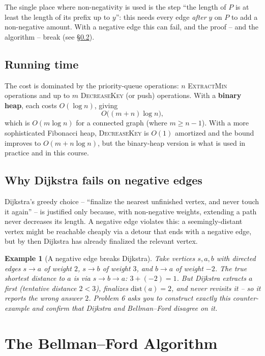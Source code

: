 \documentclass[11pt]{article}
\newtheorem{example}[theorem]{Example}
\begin{document}
The single place where non-negativity is used is the step ``the length of $P$ is
at least the length of its prefix up to $y$'': this needs every edge \emph{after}
$y$ on $P$ to add a non-negative amount. With a negative edge this can fail, and
the proof -- and the algorithm -- break (see \S\ref{sec:negative}).

\subsection{Running time}

The cost is dominated by the priority-queue operations: $n$ \textsc{ExtractMin}
operations and up to $m$ \textsc{DecreaseKey} (or push) operations. With a
\textbf{binary heap}, each costs $O(\log n)$, giving
\[
    O\big((m + n)\log n\big),
\]
which is $O(m \log n)$ for a connected graph (where $m \ge n - 1$). With a more
sophisticated Fibonacci heap, \textsc{DecreaseKey} is $O(1)$ amortized and the
bound improves to $O(m + n\log n)$, but the binary-heap version is what is used
in practice and in this course.

\subsection{Why Dijkstra fails on negative edges}
\label{sec:negative}

Dijkstra's greedy choice -- ``finalize the nearest unfinished vertex, and never
touch it again'' -- is justified only because, with non-negative weights,
extending a path never decreases its length. A negative edge violates this: a
seemingly-distant vertex might be reachable cheaply via a detour that ends with a
negative edge, but by then Dijkstra has already finalized the relevant vertex.

\begin{example}[A negative edge breaks Dijkstra]
Take vertices $s, a, b$ with directed edges $s \to a$ of weight $2$, $s \to b$
of weight $3$, and $b \to a$ of weight $-2$. The true shortest distance to $a$ is
via $s \to b \to a$: $3 + (-2) = 1$. But Dijkstra extracts $a$ first (tentative
distance $2 < 3$), finalizes $\mathrm{dist}(a) = 2$, and never revisits it -- so
it reports the wrong answer $2$. Problem 6 asks you to construct exactly this
counter-example and confirm that Dijkstra and Bellman--Ford disagree on it.
\end{example}

\section{The Bellman--Ford Algorithm}
\end{document}
